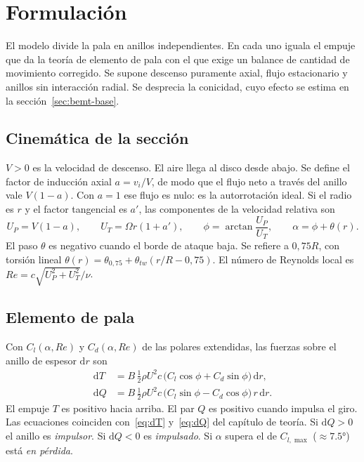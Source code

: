 \section{Formulación}\label{sec:bemt-form}

El modelo divide la pala en anillos independientes. En cada uno iguala el empuje que da
la teoría de elemento de pala con el que exige un balance de cantidad de movimiento
corregido. Se supone descenso puramente axial, flujo estacionario y anillos sin
interacción radial. Se desprecia la conicidad, cuyo efecto se estima en la
sección~\ref{sec:bemt-base}.

\subsection{Cinemática de la sección}

$V>0$ es la velocidad de descenso. El aire llega al disco desde abajo. Se define el
factor de inducción axial $a=v_i/V$, de modo que el flujo neto a través del anillo vale
$V(1-a)$. Con $a=1$ ese flujo es nulo: es la autorrotación ideal. Si el radio es $r$ y el
factor tangencial es $a'$, las componentes de la velocidad relativa son
\begin{equation}
  U_P=V(1-a),\qquad U_T=\Omega r(1+a'),\qquad \phi=\arctan\frac{U_P}{U_T},\qquad
  \alpha=\phi+\theta(r).
  \label{eq:bemt-cinem}
\end{equation}
El paso $\theta$ es negativo cuando el borde de ataque baja. Se refiere a $0{,}75R$, con
torsión lineal $\theta(r)=\theta_{0,75}+\theta_{tw}(r/R-0{,}75)$. El número de Reynolds
local es $Re=c\sqrt{U_P^2+U_T^2}/\nu$.

\subsection{Elemento de pala}

Con $C_l(\alpha,Re)$ y $C_d(\alpha,Re)$ de las polares extendidas, las fuerzas sobre el
anillo de espesor $\mathrm{d}r$ son
\begin{align}
  \mathrm{d}T &= B\,\tfrac12\rho U^2 c\,\big(C_l\cos\phi+C_d\sin\phi\big)\,\mathrm{d}r,
  \label{eq:bemt-dT}\\
  \mathrm{d}Q &= B\,\tfrac12\rho U^2 c\,\big(C_l\sin\phi-C_d\cos\phi\big)\,r\,\mathrm{d}r.
  \label{eq:bemt-dQ}
\end{align}
El empuje $T$ es positivo hacia arriba. El par $Q$ es positivo cuando impulsa el giro.
Las ecuaciones coinciden con~\eqref{eq:dT} y~\eqref{eq:dQ} del capítulo de teoría. Si
$\mathrm{d}Q>0$ el anillo es \emph{impulsor}. Si $\mathrm{d}Q<0$ es \emph{impulsado}. Si
$\alpha$ supera el de $C_{l,\max}$ ($\approx\ang{7.5}$) está \emph{en pérdida}.

